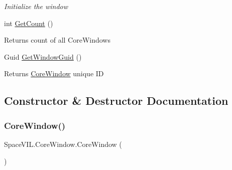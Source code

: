 \begin{DoxyCompactItemize}
\begin{DoxyCompactList}\small\item\em Initialize the window \end{DoxyCompactList}\item 
\mbox{\label{class_space_v_i_l_1_1_core_window_ab2dfb1898786db2f0f5e3e8ab9c16740}} 
int \mbox{\hyperlink{class_space_v_i_l_1_1_core_window_ab2dfb1898786db2f0f5e3e8ab9c16740}{Get\+Count}} ()
\begin{DoxyCompactList}\small\item\em \begin{DoxyReturn}{Returns}
count of all Core\+Windows 
\end{DoxyReturn}
\end{DoxyCompactList}\item 
\mbox{\label{class_space_v_i_l_1_1_core_window_a04760976a0d65dace0718bfb50a6a6ba}} 
Guid \mbox{\hyperlink{class_space_v_i_l_1_1_core_window_a04760976a0d65dace0718bfb50a6a6ba}{Get\+Window\+Guid}} ()
\begin{DoxyCompactList}\small\item\em \begin{DoxyReturn}{Returns}
\mbox{\hyperlink{class_space_v_i_l_1_1_core_window}{Core\+Window}} unique ID 
\end{DoxyReturn}
\end{DoxyCompactList}\end{DoxyCompactItemize}


\subsection{Constructor \& Destructor Documentation}
\mbox{\label{class_space_v_i_l_1_1_core_window_a49cb7bafc382c7d12250676e20c3327b}} 
\subsubsection{\texorpdfstring{Core\+Window()}{CoreWindow()}}
{\footnotesize\ttfamily Space\+V\+I\+L.\+Core\+Window.\+Core\+Window (\begin{DoxyParamCaption}{ }\end{DoxyParamCaption})\hspace{0.3cm}{\ttfamily [inline]}}



